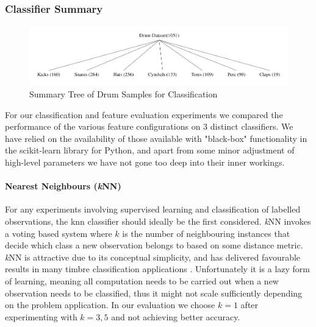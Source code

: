 {{{{\subsubsection{Classifier Summary}

\begin{figure}
	\begin{center}
		\includegraphics[width=1.0\textwidth]{ch05_pyconcat/figures/drum_distribution.pdf}
	\end{center}
	\caption[Summary Tree of Drum Samples for Classification]{Summary Tree of Drum Samples for Classification}
	\label{fig:drum_tree}
\end{figure}

For our classification and feature evaluation experiments we compared the performance of the various feature configurations on 3 distinct classifiers. We have relied on the availability of those available with "black-box" functionality in the scikit-learn \citep{Pedregosa2012} library for Python, and apart from some minor adjustment of high-level parameters we have not gone too deep into their inner workings.

\paragraph{Nearest Neighbours (\textit{k}NN)}

For any experiments involving supervised learning and classification of labelled observations, the \acrfull{knn} classifier should ideally be the first considered. \textit{k}NN invokes a voting based system where $k$ is the number of neighbouring instances that decide which class a new observation belongs to based on some distance metric. \textit{k}NN is attractive due to its conceptual simplicity, and has delivered favourable results in many timbre classification applications \citep{Herrera2002, Herrera2003, Herrera-Boyer2003, Mandel2005, Wang2006, Somerville2008}. Unfortunately it is a lazy form of learning, meaning all computation needs to be carried out when a new observation needs to be classified, thus it might not scale sufficiently depending on the problem application. In our evaluation we choose $k=1$ after  experimenting with $k=3,5$ and not achieving better accuracy.

}}}}
